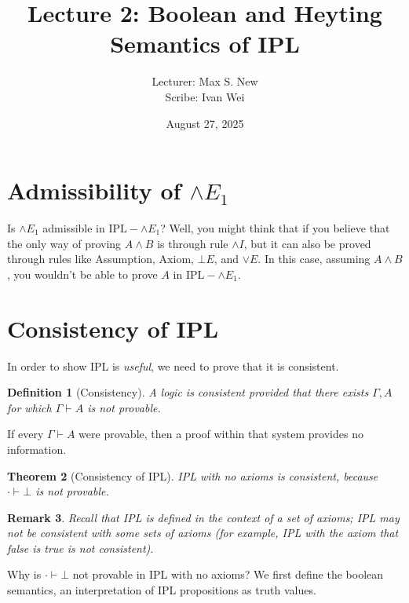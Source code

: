 \documentclass[12pt]{article}
\newtheorem{theorem}{Theorem}[section]
\newtheorem{definition}[theorem]{Definition}
\newtheorem{remark}[theorem]{Remark}
\begin{document}
\title{Lecture 2: Boolean and Heyting Semantics of IPL}
\author{Lecturer: Max S. New\\ Scribe: Ivan Wei}
\date{August 27, 2025}
\maketitle

\maketitle

\section{Admissibility of $\land E_1$}
Is $\land E_1$ admissible in $\text{IPL} - \land E_1$? Well, you might think that if you believe that the only way of proving $A \land B$ is through rule $\land I$, but it can also be proved through rules like Assumption, Axiom, $\bot E$, and $\lor E$. In this case, assuming $A \land B$, you wouldn't be able to prove $A$ in $\text{IPL} - \land E_1$.

\section{Consistency of IPL}
In order to show IPL is \textit{useful}, we need to prove that it is consistent.

\begin{definition}[Consistency]
A logic is consistent provided that there exists $\Gamma, A$ for which $\Gamma \vdash A$ is not provable.
\end{definition}

If every $\Gamma \vdash A$ were provable, then a proof within that system provides no information.

\begin{theorem}[Consistency of IPL]\label{ConsistencyIPL}
IPL with no axioms is consistent, because $\cdot \vdash \bot$ is not provable.
\end{theorem}

\begin{remark}
Recall that IPL is defined in the context of a set of axioms; IPL may not be consistent with some sets of axioms (for example, IPL with the axiom that false is true is not consistent).
\end{remark}

Why is $\cdot \vdash \bot$ not provable in IPL with no axioms? We first define the boolean semantics, an interpretation of IPL propositions as truth values.
\end{document}
